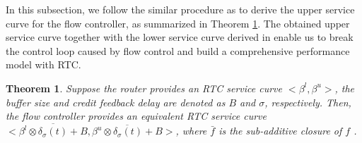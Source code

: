 \documentclass[10pt,journal]{IEEEtran}
\newtheorem{theorem}{Theorem}
\begin{document}
In this subsection, we follow the similar procedure as \cite{qian2009analysis} to derive the upper service curve for the flow controller, as summarized in Theorem \ref{credit}. The obtained upper service curve together with the lower service curve derived in \cite{qian2009analysis} enable us to break the control loop caused by flow control and build a comprehensive performance model with RTC.
\begin{theorem}\label{credit}
Suppose the router provides an RTC service curve $<\beta^l,\beta^u>$, the buffer size and credit feedback delay are denoted as $B$ and $\sigma$, respectively. Then, the flow controller provides an equivalent RTC service curve $<\overline{\beta^l\otimes\delta_\sigma(t)+B},\overline{\beta^u\otimes\delta_\sigma(t)+B}>$, where $\bar{f}$ is the sub-additive closure of $f$ \cite{Boudec2001Network}.
\end{theorem}
\end{document}
